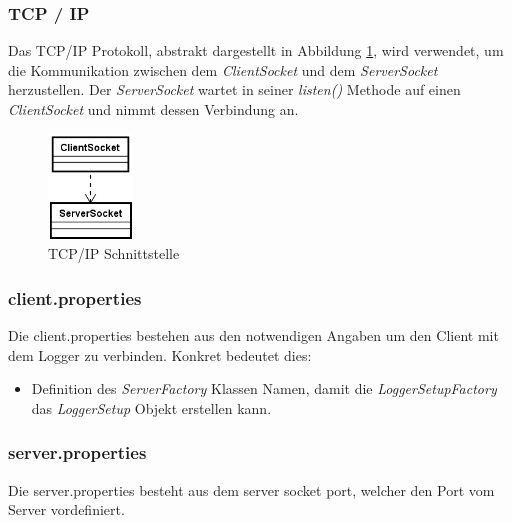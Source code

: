 \subsubsection{TCP / IP}
Das TCP/IP Protokoll, abstrakt dargestellt in Abbildung \ref{fig:TCP/IP Klassendiagramm}, wird verwendet, um die Kommunikation zwischen dem \textit{ClientSocket} und dem \textit{ServerSocket} herzustellen. Der \textit{ServerSocket} wartet in seiner \textit{listen()} Methode auf einen \textit{ClientSocket} und nimmt dessen Verbindung an.
\begin{figure}[H]
	\centering
	\includegraphics[width=0.2\textwidth]{3_Schnittstellen/Bilder/tcpip.png}
	\caption{TCP/IP Schnittstelle}
	\label{fig:TCP/IP Klassendiagramm}
\end{figure}

\subsubsection{client.properties}
Die client.properties bestehen aus den notwendigen Angaben um den Client mit dem Logger zu verbinden. Konkret bedeutet dies:
\begin{itemize}
	\item Definition des \textit{ServerFactory} Klassen Namen, damit die \textit{LoggerSetupFactory} das \textit{LoggerSetup} Objekt erstellen kann.
\end{itemize}

\subsubsection{server.properties}
Die server.properties besteht aus dem server socket port, welcher den Port vom Server vordefiniert.


